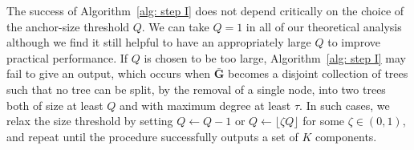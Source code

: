 \documentclass[twoside,11pt]{article}
\theoremstyle{remark}
\begin{document}
\begin{remark}
\label{remark: shrinkage parameter}
The success of Algorithm~\ref{alg: step I} does not depend critically on the choice of the anchor-size threshold $Q$. We can take $Q = 1$ in all of our theoretical analysis although we find it still helpful to have an appropriately large $Q$ to improve practical performance. If $Q$ is chosen to be too large, Algorithm~\ref{alg: step I} may fail to give an output, which occurs when $\bar{\bm{G}}$ becomes a disjoint collection of trees such that no tree can be split, by the removal of a single node, into two trees both of size at least $Q$ and with maximum degree at least $\tau$. In such cases, we relax the size threshold by setting $Q \leftarrow Q-1$ or $Q \leftarrow \lfloor \zeta Q \rfloor$ for some $\zeta \in (0,1)$, and repeat until the procedure successfully outputs a set of $K$ components. 
\end{remark}







\end{document}
